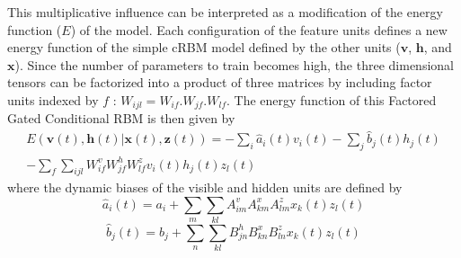 \documentclass[letterpaper]{article}
\begin{document}
This multiplicative influence can be interpreted as a modification of the energy function ($E$) of the model. Each configuration of the feature units defines a new energy function of the simple cRBM model defined by the other units ($\bm{v}$, $\bm{h}$, and $\bm{x}$). Since the number of parameters to train becomes high, the three dimensional tensors can be factorized into a product of three matrices by including factor units indexed by $f$ : $W_{ijl} = W_{if} . W_{jf} . W_{lf}$.
The energy function of this Factored Gated Conditional RBM is then given by
\begin{equation}
\begin{split}
E(\bm{v}(t),\bm{h}(t)|\bm{x}(t),\bm{z}(t)) = - \sum_{i} \hat{a}_{i}(t)v_{i}(t) - \sum_{j} \hat{b}_{j}(t)h_{j}(t)\\
-\sum_{f}\sum_{ijl} W_{if}^{v} W_{jf}^{h} W_{lf}^{z} v_{i}(t) h_{j}(t) z_{l}(t) 
\end{split}
\end{equation}
where the dynamic biases of the visible and hidden units are defined by
\begin{equation}
\hat{a}_{i}(t) = a_{i} + \sum_{m} \sum_{kl}A_{im}^{v}A_{km}^{x}A_{lm}^{z}x_{k}(t)z_{l}(t)
\end{equation}
\begin{equation}
\hat{b}_{j}(t) = b_{j} + \sum_{n} \sum_{kl}B_{jn}^{h}B_{kn}^{x}B_{ln}^{z}x_{k}(t)z_{l}(t)
\end{equation}
%
\end{document}
